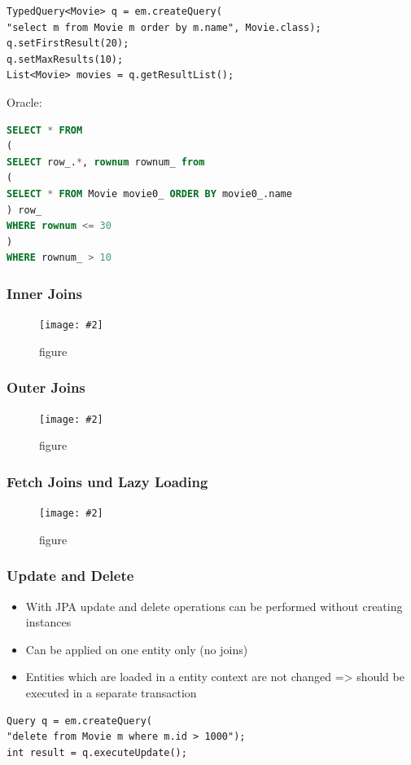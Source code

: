 \documentclass[a4paper,10pt]{scrreprt}
\newcommand{\pic}[2][figure]{\begin{figure}[h]
 \centering
 \texttt{[image: \#2]}
 \caption{#1}
\end{figure}
}
\begin{document}
\begin{lstlisting}[caption=Weitere Beispiele Order + Paging]
 TypedQuery<Movie> q = em.createQuery(
"select m from Movie m order by m.name", Movie.class);
q.setFirstResult(20);
q.setMaxResults(10);
List<Movie> movies = q.getResultList();
\end{lstlisting}
Oracle:
\begin{lstlisting}[language=sql]
 SELECT * FROM
(
SELECT row_.*, rownum rownum_ from
(
SELECT * FROM Movie movie0_ ORDER BY movie0_.name
) row_
WHERE rownum <= 30
)
WHERE rownum_ > 10
\end{lstlisting}

\subsubsection{Inner Joins}
\pic{ijex.png}
\subsubsection{Outer Joins}
\pic{ojex.png}
\subsubsection{Fetch Joins und Lazy Loading}
\pic{fjll.png}
\subsubsection{Update and Delete}
\begin{itemize}
\item With JPA update and delete operations can be performed without
creating instances
\item Can be applied on one entity only (no joins)
\item  Entities which are loaded in a entity context are not changed  => should be executed in a separate transaction
\end{itemize}
\begin{lstlisting}[caption= Bulk update und Delete]
 Query q = em.createQuery(
"delete from Movie m where m.id > 1000");
int result = q.executeUpdate();
\end{lstlisting}
\end{document}
